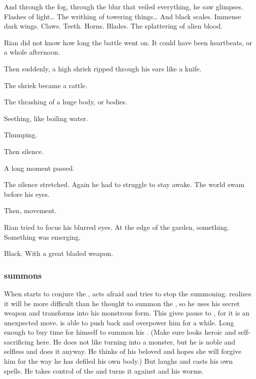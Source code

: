 {  And through the fog, through the blur that veiled everything, he saw glimpses. Flashes of light\ldots{}  
  The writhing of towering things\ldots{} 
  And black scales. Immense dark wings. Claws. Teeth. Horns. Blades. 
  The splattering of alien blood. 
  
  Rian did not know how long the battle went on. It could have been heartbeats, or a whole afternoon.  
  
  Then suddenly, a high shriek ripped through his ears like a knife. 
  
  The shriek became a rattle. 
  
  The thrashing of a huge body, or bodies.
  
  Seething, like boiling water. 
  
  Thumping. 
  
  Then silence. 
  
  A long moment passed. 
  
  
  The silence stretched. Again he had to struggle to stay awake. The world swam before his eyes. 
  
  Then, movement. 
  
  Rian tried to focus his blurred eyes. At the edge of the garden, something. Something was emerging. 
  
  Black. With a great bladed weapon. 
  
}





\subsubsection{\Teshrial summons \malgryph}
When \Teshrial starts to conjure the \malgryph, \Ishnaruchaefir acts afraid and tries to stop the summoning.
\Teshrial realizes it will be more difficult than he thought to summon the \malgryph, so he uses his secret weapon and transforms into his monstrous form.
This gives pause to \Ishnaruchaefir, for it is an unexpected move. 
\Teshrial is able to push back \Ishnaruchaefir and overpower him for a while. 
Long enough to buy time for himself to summon his \malgryph.
(Make sure \Teshrial looks heroic and self-sacrificing here. He does not like turning into a monster, but he is noble and selfless and does it anyway. He thinks of his beloved and hopes she will forgive him for the way he has defiled his own body.)
But \Ishnaruchaefir laughs and casts his own spells.
He takes control of the \malgryph and turns it against \Teshrial and his worms.





